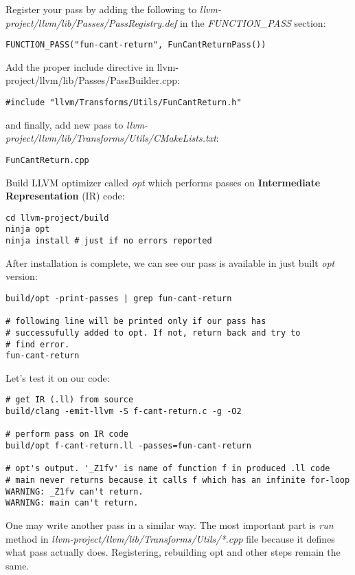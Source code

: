 \documentclass{report}
\begin{document}
Register your pass by adding the following to \textit{llvm-project/llvm/lib/Passes/PassRegistry.def} in the \textit{FUNCTION\_PASS} section:
\begin{verbatim}
FUNCTION_PASS("fun-cant-return", FunCantReturnPass())
\end{verbatim}
Add the proper include directive in llvm-project/llvm/lib/Passes/PassBuilder.cpp:
\begin{verbatim}
#include "llvm/Transforms/Utils/FunCantReturn.h"
\end{verbatim}
and finally, add new pass to \textit{llvm-project/llvm/lib/Transforms/Utils/CMakeLists.txt}:
\begin{verbatim}
FunCantReturn.cpp
\end{verbatim}
Build LLVM optimizer called \textit{opt} which performs passes on \textbf{Intermediate Representation} (IR) code:
\begin{verbatim}
cd llvm-project/build
ninja opt
ninja install # just if no errors reported
\end{verbatim}
After installation is complete, we can see our pass is available in just built \textit{opt} version:
\begin{verbatim}
build/opt -print-passes | grep fun-cant-return

# following line will be printed only if our pass has 
# successufully added to opt. If not, return back and try to
# find error.
fun-cant-return
\end{verbatim}
Let's test it on our code:
\begin{verbatim}
# get IR (.ll) from source
build/clang -emit-llvm -S f-cant-return.c -g -O2

# perform pass on IR code
build/opt f-cant-return.ll -passes=fun-cant-return 

# opt's output. '_Z1fv' is name of function f in produced .ll code
# main never returns because it calls f which has an infinite for-loop
WARNING: _Z1fv can't return.
WARNING: main can't return.
\end{verbatim}
One may write another pass in a similar way. The most important part is \textit{run} method in \textit{llvm-project/llvm/lib/Transforms/Utils/*.cpp} file because it defines what pass actually does. Registering, rebuilding opt and other steps remain the same.
\end{document}
